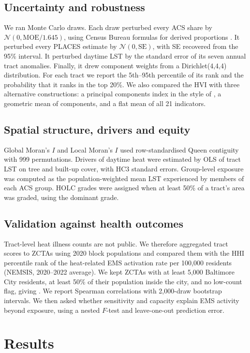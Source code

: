 \documentclass[11pt]{article}
\begin{document}
\subsection{Uncertainty and robustness}
We ran \MCdraws{} Monte Carlo draws. Each draw perturbed every ACS share by $\mathcal N(0,\mathrm{MOE}/1.645)$, using Census Bureau formulas for derived proportions \citep{acsguide}. It perturbed every PLACES estimate by $\mathcal N(0,\mathrm{SE})$, with SE recovered from the 95\% interval. It perturbed daytime LST by the standard error of its seven annual tract anomalies. Finally, it drew component weights from a Dirichlet(4,4,4) distribution. For each tract we report the 5th--95th percentile of its rank and the probability that it ranks in the top 20\%. We also compared the HVI with three alternative constructions: a principal components index in the style of \citet{reid2009}, a geometric mean of components, and a flat mean of all 21 indicators.

\subsection{Spatial structure, drivers and equity}
Global Moran's $I$ \citep{moran1950} and Local Moran's $I$ \citep{anselin1995} used row-standardised Queen contiguity with 999 permutations. Drivers of daytime heat were estimated by OLS of tract LST on tree and built-up cover, with HC3 standard errors. Group-level exposure was computed as the population-weighted mean LST experienced by members of each ACS group. HOLC grades were assigned when at least 50\% of a tract's area was graded, using the dominant grade.

\subsection{Validation against health outcomes}
Tract-level heat illness counts are not public. We therefore aggregated tract scores to ZCTAs using 2020 block populations and compared them with the HHI percentile rank of the heat-related EMS activation rate per 100,000 residents (NEMSIS, 2020--2022 average). We kept ZCTAs with at least 5,000 Baltimore City residents, at least 50\% of their population inside the city, and no low-count flag, giving \NZcta. We report Spearman correlations with 2,000-draw bootstrap intervals. We then asked whether sensitivity and capacity explain EMS activity beyond exposure, using a nested $F$-test and leave-one-out prediction error.

\section{Results}
\end{document}
